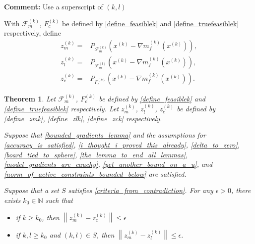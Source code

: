 \documentclass{article}
\newenvironment{comment}
  {\par\medskip
   \color{red}%
   \begin{framed}
   \textbf{Comment: }\ignorespaces}
 {\end{framed}
  \medskip}
\newtheorem{theorem}{Theorem}[section]
\theoremstyle{case}
\numberwithin{theorem}{subsection}
\newcommand{\feasiblek}{{\mathcal F_m^{(k)}}}
\newcommand{\feasiblel}{{\mathcal F_m^{(l)}}}
\newcommand{\gk}{{\nabla m_f^{(k)}\left(\xk\right)}}
\newcommand{\naturals}{\mathbb N}
\newcommand{\xk}{x^{(k)}}
\newcommand{\truefeasiblek}{{F_c^{(k)}}}
\newcommand{\zmk}{{z_m^{(k)}}}
\newcommand{\zlk}{{z_l^{(k)}}}
\newcommand{\zck}{{z_c^{(k)}}}
\begin{document}
\begin{comment}
Use a superscript of $(k, l)$
\end{comment}

With $\feasiblek$, $\truefeasiblek$ be defined by \cref{define_feasiblek} and \cref{define_truefeasiblek} respectively, define
\begin{align}
z_m^{(k)} =& P_{\feasiblek}\left(\xk - \gk\right), \label{define_zmk} \\
z_l^{(k)} =& P_{\feasiblel}\left(\xk - \gk\right), \label{define_zlk} \\
z_c^{(k)} =& P_{\truefeasiblek}\left(\xk - \gk\right). \label{define_zck}
\end{align}


\begin{theorem}
Let $\feasiblek$, $\truefeasiblek$ be defined by \cref{define_feasiblek} and \cref{define_truefeasiblek} respectively.
Let $\zmk$, $\zlk$, $\zck$ be defined by \cref{define_zmk}, \cref{define_zlk}, \cref{define_zck} respectively.

Suppose that 
\cref{bounded_gradients_lemma}
and the assumptions for
\cref{accuracy_is_satisfied},
\cref{i_thought_i_proved_this_already},
\cref{delta_to_zero},
\cref{board_tied_to_sphere},
\cref{the_lemma_to_end_all_lemmas},
\cref{model_gradients_are_cauchy},
\cref{yet_another_bound_on_a_u},
and \cref{norm_of_active_constraints_bounded_below}
are satisfied.

Suppose that a set $S$ satisfies \cref{criteria_from_contradiction}.
For any $\epsilon > 0$, there exists $k_0 \in \naturals$ such that
\begin{itemize}
\item if $k \ge k_0$, then
$
\left\|\zmk - \zck\right\| \le \epsilon
$
\item if $k, l \ge k_0$ and $(k, l) \in S$, then 
$
\left\|\zmk - \zlk\right\| \le \epsilon.
$
\end{itemize}
\end{theorem}
\end{document}
